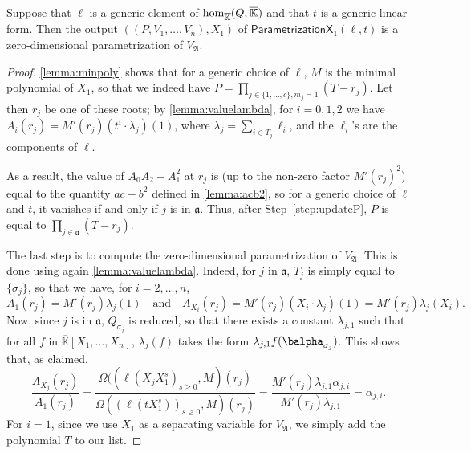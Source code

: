 \documentclass[12pt]{article}
\def\Kbar {{\ensuremath{\overline{\mathbb{K}}}}}
\begin{document}
\begin{lemma}
	Suppose that $\ell$ is a generic element of ${\rm
		hom}_{\Kbar}(Q,\Kbar)$ and that $t$ is a generic linear form. Then
	the output $((P,V_1,\dots,V_n),X_1)$ of
	$\mathsf{ParametrizationX}_1(\ell,t)$ is a zero-dimensional
	parametrization of $V_{\mathfrak{A}}$.
\end{lemma}
\begin{proof}
	\cref{lemma:minpoly} shows that for a generic choice of $\ell$,
	$M$ is the minimal polynomial of $X_1$, so that we indeed have
	$P=\prod_{j \in \{1,\dots,c\}, m_j=1} (T-r_j)$. Let then $r_j$ be
	one of these roots; by \cref{lemma:valuelambda}, for $i=0,1,2$
	we have $ A_i(r_j) = M'(r_j) (t^i \cdot \lambda_j)(1)$, where
	$\lambda_j =\sum_{i \in T_j} \ell_i$, and the $\ell_i$'s are the
	components of $\ell$. 
	
	As a result, the value of $ A_0  A_2 -  A_1^2$ at
	$r_j$ is (up to the non-zero factor $M'(r_j)^2$) equal to the
	quantity $ac-b^2$ defined in \cref{lemma:acb2}, so for a
	generic choice of $\ell$ and $t$, it vanishes if and only if $j$ is
	in $\mathfrak{a}$. Thus, after Step~\ref{step:updateP}, 
	$P$ is equal to $\prod_{j \in \mathfrak{a}} (T-r_j)$.
	
	The last step is to compute the zero-dimensional parametrization of
	$V_{\mathfrak{A}}$. This is done using again
	\cref{lemma:valuelambda}. Indeed, for $j$ in $\mathfrak{a}$, 
	$T_j$ is simply equal to $\{\sigma_j\}$, so that we have, for $i=2,\dots,n$,
	$$ A_1(r_j)=M'(r_j) \lambda_j(1) \quad\text{and}\quad 
	A_{X_i}(r_j) = M'(r_j) (X_i \cdot \lambda_j)(1) = M'(r_j) \lambda_j(X_i).$$ Now, since $j$
	is in $\mathfrak{a}$, $Q_{\sigma_j}$ is reduced, so that there
	exists a constant $\lambda_{j,1}$ such that for all $f$ in
	$\Kbar[X_1,\dots,X_n]$, $\lambda_j(f)$ takes the form $\lambda_{j,1}
	f(\balpha_{\sigma_j})$. This shows that, as claimed,
	$$\frac{ A_{X_j}(r_j)}{ A_1 (r_j)} = 
	\frac {\Omega((\ell(X_j X_1^s)_{s\ge0},M)(r_j)}{\Omega((\ell(t X_1^s))_{s\ge0},M)(r_j)}=
	\frac
	{M'(r_j) \lambda_{j,1} \alpha_{j,i}}{M'(r_j) \lambda_{j,1}} = \alpha_{j,i}.$$
	For $i=1$, since we use $X_1$ as a separating variable for $V_{\mathfrak{A}}$, 
	we simply add the polynomial $T$ to our list.
\end{proof}
\end{document}
